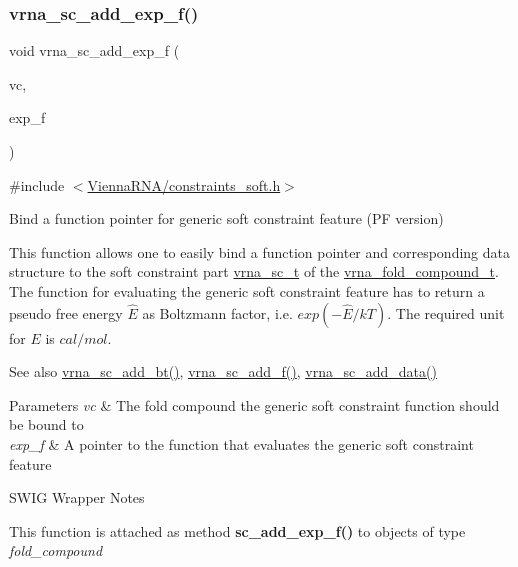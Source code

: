 \subsubsection{\texorpdfstring{vrna\+\_\+sc\+\_\+add\+\_\+exp\+\_\+f()}{vrna\_sc\_add\_exp\_f()}}
{\footnotesize\ttfamily void vrna\+\_\+sc\+\_\+add\+\_\+exp\+\_\+f (\begin{DoxyParamCaption}\item[{\hyperlink{group__fold__compound_ga1b0cef17fd40466cef5968eaeeff6166}{vrna\+\_\+fold\+\_\+compound\+\_\+t} $\ast$}]{vc,  }\item[{\hyperlink{group__soft__constraints_ga4099978d410513edeeff8f3db13144c5}{vrna\+\_\+callback\+\_\+sc\+\_\+exp\+\_\+energy} $\ast$}]{exp\+\_\+f }\end{DoxyParamCaption})}



{\ttfamily \#include $<$\hyperlink{constraints__soft_8h}{Vienna\+R\+N\+A/constraints\+\_\+soft.\+h}$>$}



Bind a function pointer for generic soft constraint feature (PF version) 

This function allows one to easily bind a function pointer and corresponding data structure to the soft constraint part \hyperlink{group__soft__constraints_ga75401ce219ef8dbcceb672db82d434c6}{vrna\+\_\+sc\+\_\+t} of the \hyperlink{group__fold__compound_ga1b0cef17fd40466cef5968eaeeff6166}{vrna\+\_\+fold\+\_\+compound\+\_\+t}. The function for evaluating the generic soft constraint feature has to return a pseudo free energy $ \hat{E} $ as Boltzmann factor, i.\+e. $ exp(- \hat{E} / kT) $. The required unit for $ E $ is $ cal/mol $.

\begin{DoxySeeAlso}{See also}
\hyperlink{group__soft__constraints_gabde7d07a79bb9a8f4721aee247b674ea}{vrna\+\_\+sc\+\_\+add\+\_\+bt()}, \hyperlink{group__soft__constraints_ga8c7d907ec0125cd61c04e0908010a4e9}{vrna\+\_\+sc\+\_\+add\+\_\+f()}, \hyperlink{group__soft__constraints_ga15c6d52471ec97897e2bb7f964f5deb6}{vrna\+\_\+sc\+\_\+add\+\_\+data()}
\end{DoxySeeAlso}

\begin{DoxyParams}{Parameters}
{\em vc} & The fold compound the generic soft constraint function should be bound to \\
\hline
{\em exp\+\_\+f} & A pointer to the function that evaluates the generic soft constraint feature\\
\hline
\end{DoxyParams}
\begin{DoxyRefDesc}{S\+W\+I\+G Wrapper Notes}
\item[\hyperlink{wrappers__wrappers000024}{S\+W\+I\+G Wrapper Notes}]This function is attached as method {\bfseries sc\+\_\+add\+\_\+exp\+\_\+f()} to objects of type {\itshape fold\+\_\+compound} \end{DoxyRefDesc}
